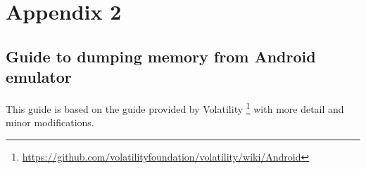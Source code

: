 \newcommand*\justify{%
  \fontdimen2\font=0.4em%
  \fontdimen3\font=0.2em%
  \fontdimen4\font=0.1em%
  \fontdimen7\font=0.1em%
  \hyphenchar\font=`\-%
}

\section{Appendix 2}
\subsection{Guide to dumping memory from Android emulator}
  This guide is based on the guide provided by Volatility \footnote{\url{https://github.com/volatilityfoundation/volatility/wiki/Android}} 
  with more detail and minor modifications.\\
  
